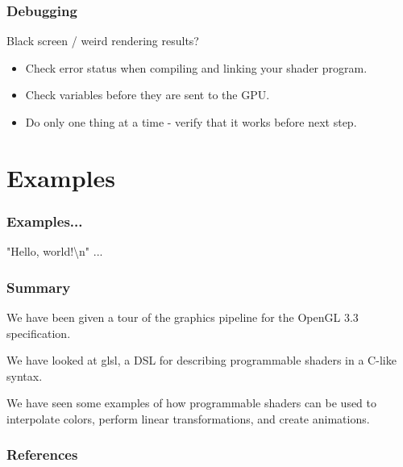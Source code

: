 \documentclass{beamer}
\begin{document}
\begin{frame}
\frametitle{Debugging}

Black screen / weird rendering results?

\begin{itemize}
\item Check error status when compiling and linking your shader program.
\item Check variables before they are sent to the GPU.
\item Do only one thing at a time - verify that it works before next step.
\end{itemize}
\end{frame}


%
%
%
\section{Examples}

\begin{frame}
\frametitle{Examples...}
"Hello, world!\textbackslash{}n" ...
\end{frame}


\begin{frame}
\frametitle{Summary}
We have been given a tour of the graphics pipeline for the OpenGL 3.3
specification.

\vspace{5mm}
We have looked at glsl, a DSL for describing programmable shaders in a C-like
syntax.

\vspace{5mm}
We have seen some examples of how programmable shaders can be used to
interpolate colors, perform linear transformations, and create animations.
\end{frame}


%
%
%
\begin{frame}
\frametitle{References}
\nocite{*}
{}

\end{frame}
\end{document}
